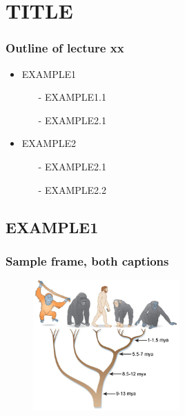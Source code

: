 \section{TITLE}

\begin{frame}\frametitle{Outline of lecture xx}
  \begin{itemize}
   \item EXAMPLE1
    \begin{itemize}
    \item[-] EXAMPLE1.1
    \item[-] EXAMPLE2.1
    \end{itemize}
  \end{itemize}
  \begin{itemize}  
   \item EXAMPLE2
    \begin{itemize}
    \item[-] EXAMPLE2.1
    \item[-] EXAMPLE2.2
    \end{itemize}
  \end{itemize}
\end{frame}

\subsection{EXAMPLE1}

\begin{frame}\frametitle{Sample frame, both captions}
  \begin{figure}[h!]
    \includegraphics[height=5cm]{figures/TS-Apes.jpg}
  \end{figure}
\end{frame}

